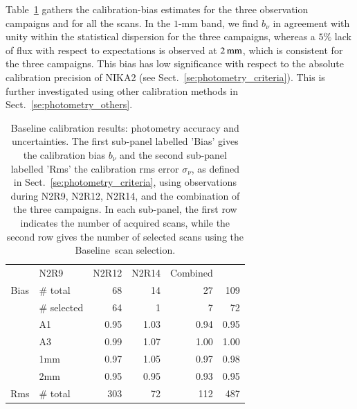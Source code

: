 \documentclass[traditionalabstract]{aa}
\newcommand{\baseline}{Baseline}%
\newcommand{\lp}[1]{#1}
\begin{document}
{\begin{figure}[!thbp]
\begin{center}
  \end{center}
\end{figure}
%
Table~\ref{tab:baseline-photometry} gathers the calibration-bias
estimates for the three observation campaigns and for all the scans.
In the $1$-mm band, we find $b_\nu$ in agreement with unity within the statistical dispersion for
the three campaigns, whereas a $5\%$ lack of flux with respect to expectations is observed
at $2\,\rm{mm}$, which is consistent for the three campaigns. This bias has low significance with respect to the absolute calibration precision of
NIKA2 (see Sect.~\ref{se:photometry_criteria}).
This is further investigated using other calibration methods
in Sect.~\ref{se:photometry_others}.

\begin{table}[!thbp]
  \begin{center}
    \caption[Baseline calibration results]{Baseline calibration results:
  photometry accuracy and uncertainties. The first sub-panel labelled 'Bias' gives the
  calibration bias $b_{\nu}$ and the second sub-panel labelled 'Rms' the calibration
  rms error $\sigma_{\nu}$, as defined in
  Sect.~\ref{se:photometry_criteria},
  using observations during N2R9, N2R12, N2R14, and the combination of
  the three campaigns. {\lp In each sub-panel, the first row indicates the
    number of acquired scans, while the second row gives the
    number of selected scans using the \baseline\ scan selection.}}
\label{tab:baseline-photometry}
\begin{tabular}{clrrrr}
  \hline\hline
  \noalign{\smallskip}
   \multicolumn{2}{c}{Characteristics} &  N2R9  & N2R12   &  N2R14 & Combined \\
  \noalign{\smallskip}
  \hline
  \noalign{\smallskip}
  Bias &  $\#$ total    &  68    &  14     &   27     &    109    \\
       &  $\#$ selected &  64    &   1     &   7      &     72    \\
       &  A1            &  0.95  &  1.03   &   0.94   &   0.95    \\
       &  A3            &  0.99  &  1.07   &   1.00   &   1.00    \\
       &  1mm           &  0.97  &  1.05   &   0.97   &   0.98    \\
       &  2mm           &  0.95  &  0.95   &   0.93   &   0.95    \\
  \hline
  \noalign{\smallskip}
  Rms  &  $\#$ total    &  303   &  72     &   112    &    487   \\

\end{tabular}
\end{center}
\end{table}}
\end{document}
